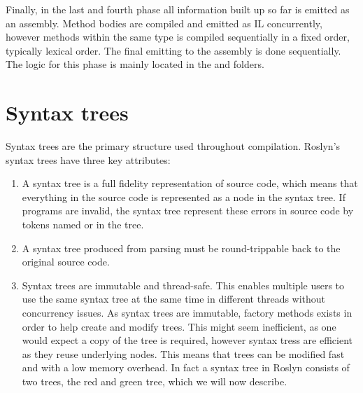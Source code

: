 Finally, in the last and fourth phase all information built up so far is emitted as an assembly. Method bodies are compiled and emitted as IL concurrently, however methods within the same type is compiled sequentially in a fixed order, typically lexical order. The final emitting to the assembly is done sequentially\cite{sadovRoslynPerf}. The logic for this phase is mainly located in the  and  folders.

\section{Syntax trees}\label{sec:syntax_trees}
Syntax trees are the primary structure used throughout compilation. Roslyn's syntax trees have three key attributes\cite[p. 6]{ng2012roslyn}: 
\begin{enumerate}
	\item A syntax tree is a full fidelity representation of source code, which means that everything in the source code is represented as a node in the syntax tree. If programs are invalid, the syntax tree represent these errors in source code by tokens named  or   in the tree. 
	\item A syntax tree produced from parsing must be round-trippable back to the original source code.
	\item Syntax trees are immutable and thread-safe. This enables multiple users to use the same syntax tree at the same time in different threads without concurrency issues. As syntax trees are immutable, factory methods exists in order to help create and modify trees. This might seem inefficient, as one would expect a copy of the tree is required, however syntax tress are efficient as they reuse underlying nodes. This means that trees can be modified fast and with a low memory overhead. In fact a syntax tree in Roslyn consists of two trees, the red and green tree, which we will now describe.
\end{enumerate}

